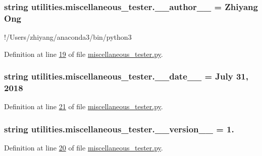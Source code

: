 \subsubsection[{\+\_\+\+\_\+author\+\_\+\+\_\+}]{\setlength{\rightskip}{0pt plus 5cm}string utilities.\+miscellaneous\+\_\+tester.\+\_\+\+\_\+author\+\_\+\+\_\+ = \textquotesingle{}Zhiyang Ong\textquotesingle{}}\label{namespaceutilities_1_1miscellaneous__tester_a1a0c5633611c3237a48f9d89ede7afdb}


!/\+Users/zhiyang/anaconda3/bin/python3 



Definition at line \hyperlink{miscellaneous__tester_8py_source_l00019}{19} of file \hyperlink{miscellaneous__tester_8py_source}{miscellaneous\+\_\+tester.\+py}.

\hypertarget{namespaceutilities_1_1miscellaneous__tester_a809790ee7c8c8154544259eed38d29b4}{}
\subsubsection[{\+\_\+\+\_\+date\+\_\+\+\_\+}]{\setlength{\rightskip}{0pt plus 5cm}string utilities.\+miscellaneous\+\_\+tester.\+\_\+\+\_\+date\+\_\+\+\_\+ = \textquotesingle{}July 31, 2018\textquotesingle{}}\label{namespaceutilities_1_1miscellaneous__tester_a809790ee7c8c8154544259eed38d29b4}


Definition at line \hyperlink{miscellaneous__tester_8py_source_l00021}{21} of file \hyperlink{miscellaneous__tester_8py_source}{miscellaneous\+\_\+tester.\+py}.

\hypertarget{namespaceutilities_1_1miscellaneous__tester_a5cf71bb548a296685a4ce1abafa02ad4}{}
\subsubsection[{\+\_\+\+\_\+version\+\_\+\+\_\+}]{\setlength{\rightskip}{0pt plus 5cm}string utilities.\+miscellaneous\+\_\+tester.\+\_\+\+\_\+version\+\_\+\+\_\+ = \textquotesingle{}1.\textquotesingle{}}\label{namespaceutilities_1_1miscellaneous__tester_a5cf71bb548a296685a4ce1abafa02ad4}


Definition at line \hyperlink{miscellaneous__tester_8py_source_l00020}{20} of file \hyperlink{miscellaneous__tester_8py_source}{miscellaneous\+\_\+tester.\+py}.

